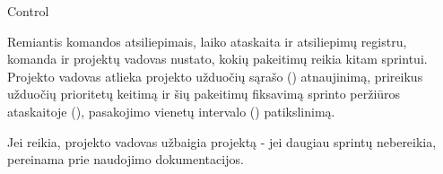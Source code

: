 \begin{processTable}{Control}
{        \item Remiantis komandos atsiliepimais, laiko ataskaita ir atsiliepimų registru, komanda ir projektų vadovas nustato, kokių pakeitimų reikia kitam sprintui.
        Projekto vadovas atlieka projekto užduočių sąrašo () atnaujinimą,
        prireikus užduočių prioritetų keitimą ir šių pakeitimų fiksavimą sprinto peržiūros ataskaitoje (), pasakojimo vienetų intervalo () patikslinimą.

        \item Jei reikia, projekto vadovas užbaigia projektą - jei daugiau sprintų nebereikia, pereinama prie naudojimo dokumentacijos.
    }
\end{processTable}

\newpage
\subsection{}

